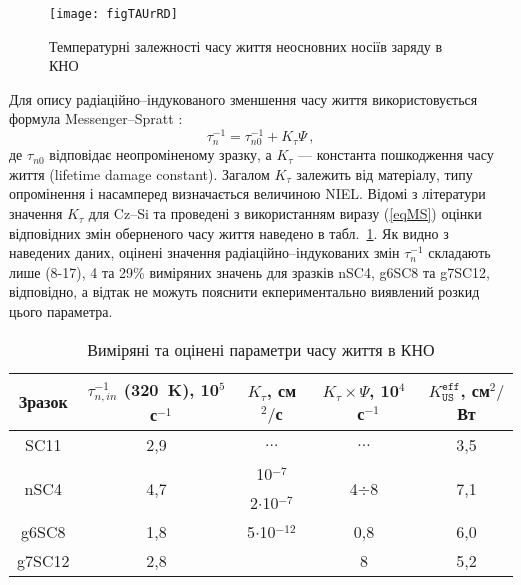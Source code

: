 \begin{figure}[b]
\center
\texttt{[image: figTAUrRD]}
\caption{\label{figTAUrRD}
Температурні залежності часу життя неосновних носіїв заряду в КНО
\FigCaptionSSCRD
}%
\end{figure}

Для опису радіаційно--індукованого зменшення часу життя використовується формула Messenger--Spratt \cite{Markvart}:
\begin{equation}
\label{eqMS}
\tau_n^{-1}=\tau_{n0}^{-1}+K_\tau\Psi\,,
\end{equation}
де
$\tau_{n0}$ відповідає неопроміненому зразку, а
$K_\tau$ --- константа пошкодження часу життя (lifetime damage constant).
Загалом $K_\tau$ залежить від матеріалу, типу опромінення і насамперед визначається величиною NIEL.
Відомі з літератури значення $K_\tau$ для Cz--Si та проведені з використанням виразу (\ref{eqMS}) оцінки відповідних
змін оберненого часу життя наведено в табл.~\ref{tabTAUn}.
Як видно з наведених даних, оцінені значення радіаційно--індукованих змін $\tau_n^{-1}$ складають лише
(8-17), 4 та 29\% виміряних значень для зразків nSC4, g6SC8 та g7SC12, відповідно, а відтак не можуть
пояснити екпериментально виявлений розкид цього параметра.

\begin{table}
\caption{\label{tabTAUn}Виміряні та оцінені параметри часу життя в КНО
}
\center
\begin{tabular}{|c|c|c|c|c|}
\hline
Зразок &$\tau_{n,in}^{-1}$ (320~K), 10$^5$~с$^{-1}$&$K_\tau$, см$^2/$с&$K_\tau\times\Psi$, 10$^4$~с$^{-1}$&$K_\mathtt{US}^\mathtt{eff}$, см$^2/$Вт\\ \hline
SC11&2,9&$\ldots$&$\ldots$&3,5\\ \hline
\multirow{2}{*}{nSC4}&\multirow{2}{*}{4,7}&10$^{-7}$ \cite{NIEL:Jafari}&\multirow{2}{*}{4$\div$8}&\multirow{2}{*}{7,1}\\ %
&&2$\cdot$10$^{-7}$ \cite{n:Gaubas}&&\\ \hline
g6SC8&1,8&5$\cdot$10$^{-12}$&0,8&6,0\\ \cline{1-2} \cline{4-5}%
g7SC12&2,8& \cite{NIEL:Jafari,gamma:Kolkov} &8&5,2\\ \hline
\end{tabular}
\end{table}

